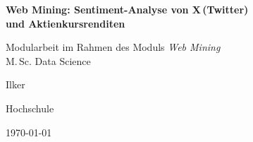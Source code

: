 \documentclass[12pt, a4paper]{article}
\begin{document}
\begin{titlepage}
  \centering
  \vspace*{2cm}

  {\LARGE\bfseries Web Mining: Sentiment-Analyse von X\,(Twitter)\\
  und Aktienkursrenditen\par}

  \vspace{1.5cm}
  {\large Modularbeit im Rahmen des Moduls \textit{Web Mining}\\
  M.\,Sc. Data Science\par}

  \vspace{2cm}
  {\large Ilker\par}

  \vspace{0.5cm}
  {\normalsize Hochschule\par}

  \vfill
  {\normalsize \today\par}
\end{titlepage}

\tableofcontents
\newpage


\newpage


\newpage


\newpage


\newpage


\newpage

\printbibliography[heading=bibintoc, title={Literaturverzeichnis}]
\end{document}

